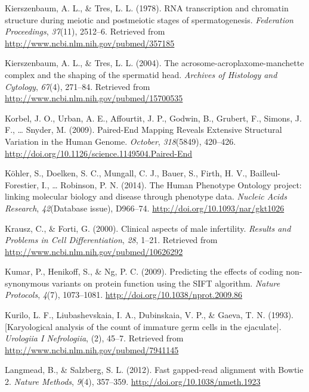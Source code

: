 \documentclass[12pt,twoside]{reedthesis}
\theoremstyle{definition}
\theoremstyle{definition}
\theoremstyle{remark}
\begin{document}
  \hypertarget{ref-Kierszenbaum1978}{}
  Kierszenbaum, A. L., \& Tres, L. L. (1978). RNA transcription and
  chromatin structure during meiotic and postmeiotic stages of
  spermatogenesis. \emph{Federation Proceedings}, \emph{37}(11), 2512--6.
  Retrieved from \url{http://www.ncbi.nlm.nih.gov/pubmed/357185}
  
  \hypertarget{ref-Kierszenbaum2004}{}
  Kierszenbaum, A. L., \& Tres, L. L. (2004). The
  acrosome-acroplaxome-manchette complex and the shaping of the spermatid
  head. \emph{Archives of Histology and Cytology}, \emph{67}(4), 271--84.
  Retrieved from \url{http://www.ncbi.nlm.nih.gov/pubmed/15700535}
  
  \hypertarget{ref-Korbel2009}{}
  Korbel, J. O., Urban, A. E., Affourtit, J. P., Godwin, B., Grubert, F.,
  Simons, J. F., \ldots{} Snyder, M. (2009). Paired-End Mapping Reveals
  Extensive Structural Variation in the Human Genome. \emph{October},
  \emph{318}(5849), 420--426.
  \url{http://doi.org/10.1126/science.1149504.Paired-End}
  
  \hypertarget{ref-Kohler2014}{}
  Köhler, S., Doelken, S. C., Mungall, C. J., Bauer, S., Firth, H. V.,
  Bailleul-Forestier, I., \ldots{} Robinson, P. N. (2014). The Human
  Phenotype Ontology project: linking molecular biology and disease
  through phenotype data. \emph{Nucleic Acids Research},
  \emph{42}(Database issue), D966--74.
  \url{http://doi.org/10.1093/nar/gkt1026}
  
  \hypertarget{ref-Krausz2000}{}
  Krausz, C., \& Forti, G. (2000). Clinical aspects of male infertility.
  \emph{Results and Problems in Cell Differentiation}, \emph{28}, 1--21.
  Retrieved from \url{http://www.ncbi.nlm.nih.gov/pubmed/10626292}
  
  \hypertarget{ref-Kumar2009}{}
  Kumar, P., Henikoff, S., \& Ng, P. C. (2009). Predicting the effects of
  coding non-synonymous variants on protein function using the SIFT
  algorithm. \emph{Nature Protocols}, \emph{4}(7), 1073--1081.
  \url{http://doi.org/10.1038/nprot.2009.86}
  
  \hypertarget{ref-Kurilo}{}
  Kurilo, L. F., Liubashevskaia, I. A., Dubinskaia, V. P., \& Gaeva, T. N.
  (1993). {[}Karyological analysis of the count of immature germ cells in
  the ejaculate{]}. \emph{Urologiia I Nefrologiia}, (2), 45--7. Retrieved
  from \url{http://www.ncbi.nlm.nih.gov/pubmed/7941145}
  
  \hypertarget{ref-Langmead2012}{}
  Langmead, B., \& Salzberg, S. L. (2012). Fast gapped-read alignment with
  Bowtie 2. \emph{Nature Methods}, \emph{9}(4), 357--359.
  \url{http://doi.org/10.1038/nmeth.1923}
  
\end{document}
